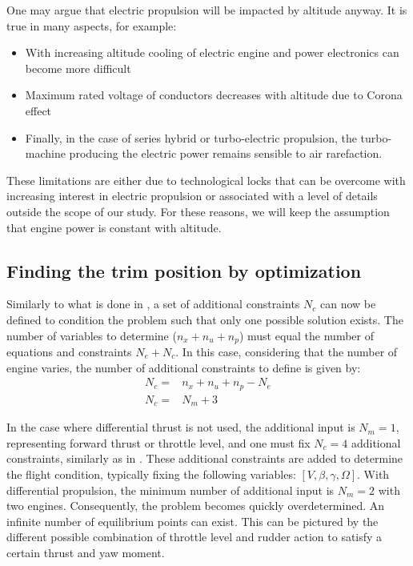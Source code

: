 One may argue that electric propulsion will be impacted by altitude anyway. It is true in many aspects, for example:
\begin{itemize}
	\item With increasing altitude cooling of electric engine and power electronics can become more difficult
	\item Maximum rated voltage of conductors decreases with altitude due to Corona effect \cite{WiringSpace}
	\item Finally, in the case of series hybrid or turbo-electric propulsion, the turbo-machine producing the electric power remains sensible to air rarefaction.
\end{itemize}

These limitations are either due to technological locks that can be overcome with increasing interest in electric propulsion or associated with a level of details outside the scope of our study. For these reasons, we will keep the assumption that engine power is constant with altitude.

\subsection{Finding the trim position by optimization}

Similarly to what is done in \cite{GomanAttainableEqui}, a set of additional constraints $N_c$ can now be defined to condition the problem such that only one possible solution exists. The number of variables to determine ($n_x+n_u+n_p$) must equal the number of equations and constraints $N_e+N_c$.
In this case, considering that the number of engine varies, the number of additional constraints to define is given by:
\begin{align}
N_c=&n_x+n_u+n_p-N_e\\
N_c=&N_m+3
\end{align}

In the case where differential thrust is not used, the additional input is $N_m=1$, representing forward thrust or throttle level, and one must fix $N_c=4$ additional constraints, similarly as in \cite{GomanAttainableEqui}. These additional constraints are added to determine the flight condition, typically fixing the following variables: $[V,\beta,\gamma,\Omega]$. With differential propulsion, the minimum number of additional input is $N_m=2$ with two engines. Consequently, the problem becomes quickly overdetermined. An infinite number of equilibrium points can exist. This can be pictured by the different possible combination of throttle level and rudder action to satisfy a certain thrust and yaw moment.

